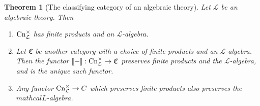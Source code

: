 \documentclass[12pt,twoside]{reedthesis}
\theoremstyle{definition}
\theoremstyle{remark}
\theoremstyle{plain}
\newtheorem{theorem}{Theorem}
\begin{document}
\begin{theorem}[The classifying category of an algebraic
  theory]\label{thm:classifying alg theory} Let \( \mathcal{L} \) be an
  algebraic theory. Then \begin{enumerate}
    \item $\mathrm{Cn}_{\mathcal{L}}^{\times}$ has finite products and an $\mathcal{L}$-algebra.
    \item Let $\mathfrak{C}$ be another category with a choice of finite
    products and an $\mathcal{L}$-algebra. Then the functor $\llbracket-\rrbracket :
    \mathrm{Cn}_{\mathcal{L}}^{\times} \rightarrow \mathfrak{C}$ preserves finite
    products and the $\mathcal{L}$-algebra, and is the unique such functor.
    \item Any functor \( \mathrm{Cn}_{\mathcal{L}}^{\times} \rightarrow C \) which
    preserves finite products also preserves the $mathcal{L}$-algebra.
  \end{enumerate}
\end{theorem}
\newcommand{\ob}{\mathrm{ob}\,}
\end{document}
